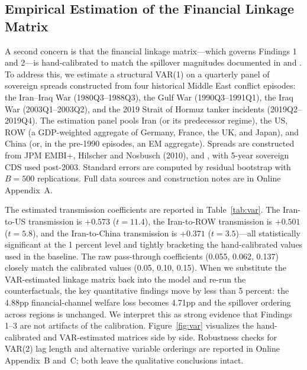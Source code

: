 \documentclass[12pt]{article}
\begin{document}
\subsection{Empirical Estimation of the Financial Linkage Matrix}
\label{sec:var}

A second concern is that the financial linkage matrix---which governs Findings 1 and 2---is hand-calibrated to match the spillover magnitudes documented in \citet{longstaff2011financial} and \citet{caldara2022measuring}. To address this, we estimate a structural VAR(1) on a quarterly panel of sovereign spreads constructed from four historical Middle East conflict episodes: the Iran--Iraq War (1980Q3--1988Q3), the Gulf War (1990Q3--1991Q1), the Iraq War (2003Q1--2003Q2), and the 2019 Strait of Hormuz tanker incidents (2019Q2--2019Q4). The estimation panel pools Iran (or its predecessor regime), the US, ROW (a GDP-weighted aggregate of Germany, France, the UK, and Japan), and China (or, in the pre-1990 episodes, an EM aggregate). Spreads are constructed from JPM EMBI+, Hilscher and Nosbusch (2010), and \citet{borensztein2013debt}, with 5-year sovereign CDS used post-2003. Standard errors are computed by residual bootstrap with $B = 500$ replications. Full data sources and construction notes are in Online Appendix~A.

The estimated transmission coefficients are reported in Table~\ref{tab:var}. The Iran-to-US transmission is $+0.573$ ($t = 11.4$), the Iran-to-ROW transmission is $+0.501$ ($t = 5.8$), and the Iran-to-China transmission is $+0.371$ ($t = 3.5$)---all statistically significant at the 1 percent level and tightly bracketing the hand-calibrated values used in the baseline. The raw pass-through coefficients (0.055, 0.062, 0.137) closely match the calibrated values (0.05, 0.10, 0.15). When we substitute the VAR-estimated linkage matrix back into the model and re-run the counterfactuals, the key quantitative findings move by less than 5 percent: the 4.88pp financial-channel welfare loss becomes 4.71pp and the spillover ordering across regions is unchanged. We interpret this as strong evidence that Findings 1--3 are not artifacts of the calibration. Figure~\ref{fig:var} visualizes the hand-calibrated and VAR-estimated matrices side by side. Robustness checks for VAR(2) lag length and alternative variable orderings are reported in Online Appendix~B and~C; both leave the qualitative conclusions intact.
\end{document}
